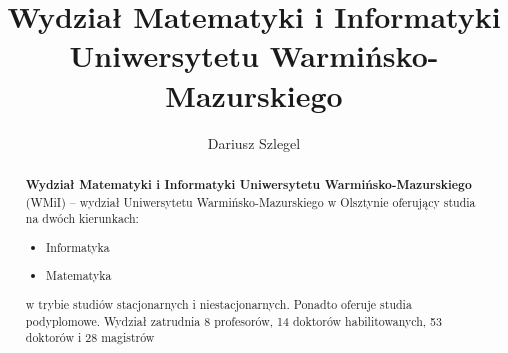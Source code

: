 \documentclass[a4paper,12pt]{article}
\title {Wydział Matematyki i Informatyki Uniwersytetu
Warmińsko-Mazurskiego}
\author{Dariusz Szlegel}
\begin{document}
\maketitle

\begin{abstract}
\textbf{Wydział Matematyki i Informatyki Uniwersytetu Warmińsko-Mazurskiego} (WMiI) – wydział
Uniwersytetu Warmińsko-Mazurskiego w Olsztynie oferujący studia na dwóch kierunkach:

\begin{itemize}
\item Informatyka
\item Matematyka
\end{itemize}
w trybie studiów stacjonarnych i niestacjonarnych. Ponadto oferuje studia podyplomowe.\newline \newline
Wydział zatrudnia 8 profesorów, 14 doktorów habilitowanych, 53 doktorów i 28 magistrów
\newline


\end{abstract}
\end{document}
